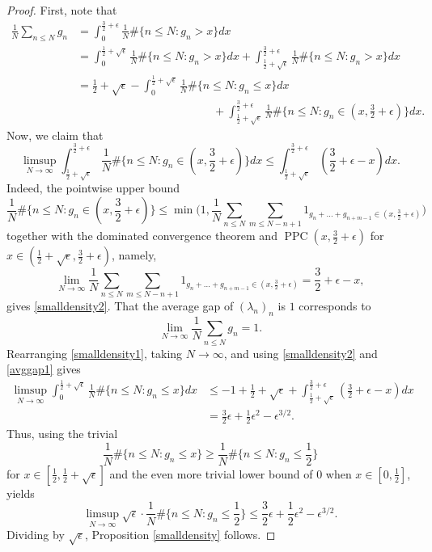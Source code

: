 \documentclass[12pt]{amsart}
\theoremstyle{definition}
\newcommand{\ep}{\epsilon}
\newcommand{\lam}{\lambda}
\DeclareMathOperator{\PPC}{PPC}
\begin{document}
\begin{proof} 
First, note that \begin{align}\label{smalldensity1} \frac{1}{N}\sum_{n \le N} g_n &= \int_0^{\frac{3}{2}+\epsilon} \frac{1}{N}\#\{n \le N : g_n > x\}dx \\ \nonumber &= \int_0^{\frac{1}{2}+\sqrt{\epsilon}} \frac{1}{N}\#\{n \le N : g_n > x\}dx + \int_{\frac{1}{2}+\sqrt{\epsilon}}^{\frac{3}{2}+\epsilon} \frac{1}{N}\#\{n \le N : g_n > x\}dx \\ \nonumber &= \frac{1}{2}+\sqrt{\epsilon}-\int_0^{\frac{1}{2}+\sqrt{\epsilon}} \frac{1}{N}\#\{n \le N : g_n \le x\}dx \\ \nonumber &\qquad \qquad \qquad \qquad \qquad \qquad + \int_{\frac{1}{2}+\sqrt{\epsilon}}^{\frac{3}{2}+\epsilon} \frac{1}{N}\#\{n \le N : g_n \in (x,\frac{3}{2}+\epsilon)\}dx. \end{align} Now, we claim that \begin{equation}\label{smalldensity2} \limsup_{N \to \infty} \int_{\frac{1}{2}+\sqrt{\epsilon}}^{\frac{3}{2}+\epsilon} \frac{1}{N}\#\{n \le N : g_n \in (x,\frac{3}{2}+\epsilon)\}dx \le \int_{\frac{1}{2}+\sqrt{\ep}}^{\frac{3}{2}+\ep} (\frac{3}{2}+\ep-x)dx.\end{equation} Indeed, the pointwise upper bound $$\frac{1}{N}\#\{n \le N : g_n \in (x,\frac{3}{2}+\epsilon)\} \le \min\Big(1,\frac{1}{N}\sum_{n \le N} \sum_{m \le N-n+1} 1_{g_n+\dots+g_{n+m-1} \in (x,\frac{3}{2}+\epsilon)}\Big)$$ together with the dominated convergence theorem and $\PPC(x, \frac{3}{2}+\ep)$ for $x \in (\frac{1}{2}+\sqrt{\ep},\frac{3}{2}+\ep)$, namely, $$\lim_{N \to \infty} \frac{1}{N}\sum_{n \le N} \sum_{m \le N-n+1} 1_{g_n+\dots+g_{n+m-1} \in (x,\frac{3}{2}+\epsilon)} = \frac{3}{2}+\epsilon-x,$$ gives \eqref{smalldensity2}. That the average gap of $(\lam_n)_n$ is $1$ corresponds to \begin{equation}\label{avggap1} \lim_{N \to \infty} \frac{1}{N}\sum_{n \le N} g_n = 1. \end{equation} Rearranging \eqref{smalldensity1}, taking $N \to \infty$, and using \eqref{smalldensity2} and \eqref{avggap1} gives \begin{align*} \limsup_{N \to \infty} \int_0^{\frac{1}{2}+\sqrt{\epsilon}} \frac{1}{N}\#\{n \le N : g_n \le x\}dx &\le -1+\frac{1}{2}+\sqrt{\epsilon}+\int_{\frac{1}{2}+\sqrt{\epsilon}}^{\frac{3}{2}+\epsilon} (\frac{3}{2}+\epsilon-x)dx \\ &= \frac{3}{2}\epsilon+\frac{1}{2}\epsilon^2-\epsilon^{3/2}.\end{align*} Thus, using the trivial $$\frac{1}{N} \#\{n \le N : g_n \le x\} \ge \frac{1}{N}\#\{n \le N : g_n \le \frac{1}{2}\}$$ for $x \in [\frac{1}{2},\frac{1}{2}+\sqrt{\ep}]$ and the even more trivial lower bound of $0$ when $x \in [0,\frac{1}{2}]$, yields $$\limsup_{N \to \infty} \sqrt{\epsilon}\cdot \frac{1}{N}\#\{n \le N : g_n \le \frac{1}{2}\} \le \frac{3}{2}\epsilon+\frac{1}{2}\epsilon^2-\epsilon^{3/2}.$$ Dividing by $\sqrt{\ep}$, Proposition \ref{smalldensity} follows.
\end{proof}
\end{document}
